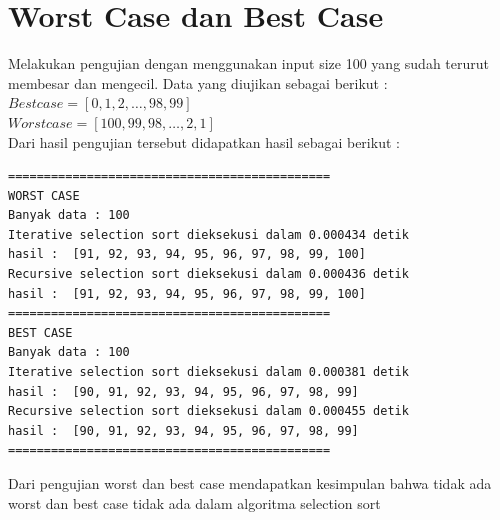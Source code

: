 \documentclass[12pt]{article}
\begin{document}
\section{Worst Case dan Best Case}
Melakukan pengujian dengan menggunakan input size 100 yang sudah terurut membesar dan mengecil.
Data yang diujikan sebagai berikut :\\
$Best case = [0, 1, 2,\dotsc,98, 99]$\\
$Worst case = [100, 99, 98,\dotsc,2, 1]$\\
Dari hasil pengujian tersebut didapatkan hasil sebagai berikut :
\begin{verbatim}
=============================================
WORST CASE
Banyak data : 100
Iterative selection sort dieksekusi dalam 0.000434 detik
hasil :  [91, 92, 93, 94, 95, 96, 97, 98, 99, 100]
Recursive selection sort dieksekusi dalam 0.000436 detik
hasil :  [91, 92, 93, 94, 95, 96, 97, 98, 99, 100]
=============================================
BEST CASE
Banyak data : 100
Iterative selection sort dieksekusi dalam 0.000381 detik
hasil :  [90, 91, 92, 93, 94, 95, 96, 97, 98, 99]
Recursive selection sort dieksekusi dalam 0.000455 detik
hasil :  [90, 91, 92, 93, 94, 95, 96, 97, 98, 99]
=============================================
\end{verbatim}
Dari pengujian worst dan best case mendapatkan kesimpulan bahwa tidak ada worst dan best case tidak ada dalam algoritma selection sort
\newpage
\end{document}

